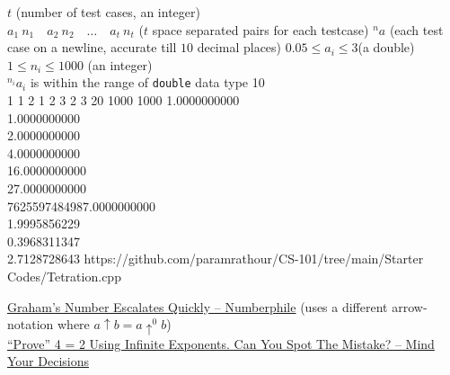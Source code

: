 \documentclass[../../Problems]{subfiles}
\begin{document}
\begin{testcases}
	{$t$ \hfill(number of test cases, an integer)\\
	$a_1\ n_1\quad a_2\ n_2\quad \ldots\quad a_t\ n_t$ \hfill($t$ space separated pairs for each testcase)}
	{${^{n}a}$ \hfill(each test case on a newline, accurate till $10$ decimal places)}
	{$0.05 \leq a_i \leq 3$\hfill(a double)\\
	$1 \leq n_i \leq 1000$ \hfill(an integer)\\${^{n_i}a_i}$ is within the range of \texttt{double} data type}
	{10\\1 1 2 1 2 3 2 3 20 1000  1000}
	{1.0000000000\\1.0000000000\\2.0000000000\\4.0000000000\\16.0000000000\\27.0000000000\\7625597484987.0000000000\\1.9995856229\\0.3968311347\\2.7128728643}
	{https://github.com/paramrathour/CS-101/tree/main/Starter Codes/Tetration.cpp}
\end{testcases}
\begin{funvideo}
\href{https://youtu.be/txajrEOTkuY}{Graham's Number Escalates Quickly -- Numberphile} (uses a different arrow-notation where $a\uparrow b=a\uparrow ^{0}b$)\\
\href{https://youtu.be/DmP3sFIZ0XE}{``Prove'' 4 = 2 Using Infinite Exponents. Can You Spot The Mistake? -- Mind Your Decisions}
\end{funvideo}
\end{document}

